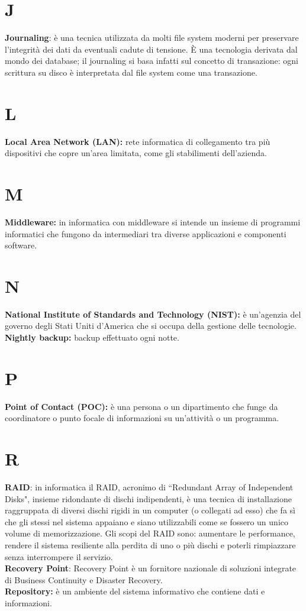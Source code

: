 \documentclass[12pt, a4paper, titlepage]{report}
\begin{document}
	\section*{J}
	\textbf{Journaling}: è una tecnica utilizzata da molti file system moderni per preservare l'integrità dei dati da eventuali cadute di tensione. È una tecnologia derivata dal mondo dei database; il journaling si basa infatti sul concetto di transazione: ogni scrittura su disco è interpretata dal file system come una transazione.
	
	\section*{L}
	\textbf{Local Area Network (LAN):} rete informatica di collegamento tra più dispositivi che copre un'area limitata, come gli stabilimenti dell'azienda.
	
	\section*{M}
		\textbf{Middleware:} in informatica con middleware si intende un insieme di programmi informatici che fungono da intermediari tra diverse applicazioni e componenti software.
	
	\section*{N}
	\textbf{National Institute of Standards and Technology (NIST):} è un'agenzia del governo degli Stati Uniti d'America che si occupa della gestione delle tecnologie.\\
	\textbf{Nightly backup:} backup effettuato ogni notte.
	
	\section*{P}
	\textbf{Point of Contact (POC):} è una persona o un dipartimento che funge da coordinatore o punto focale di informazioni su un'attività o un programma.
	
	\section*{R}
	\textbf{RAID}: in informatica il RAID, acronimo di ``Redundant Array of Independent Disks", insieme ridondante di dischi indipendenti, è una tecnica di installazione raggruppata di diversi dischi rigidi in un computer (o collegati ad esso) che fa sì che gli stessi nel sistema appaiano e siano utilizzabili come se fossero un unico volume di memorizzazione. Gli scopi del RAID sono: aumentare le performance, rendere il sistema resiliente alla perdita di uno o più dischi e poterli rimpiazzare senza interrompere il servizio.\\
	\textbf{Recovery Point}: Recovery Point è un fornitore nazionale di soluzioni integrate di Business Continuity e Disaster Recovery.\\
	\textbf{Repository:} è un ambiente del sistema informativo che contiene dati e informazioni.
	
\end{document}
